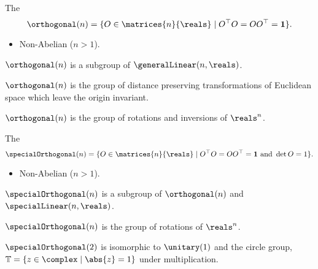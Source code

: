 \begin{dfn}{}{}
    The 
    \begin{equation}
        \orthogonal(n) = \{ O \in \matrices{n}{\reals} \mid O^\trans O = OO^\trans = \ident \}.
    \end{equation}
    
    \begin{multicols}{2}
        \begin{itemize}
            \item Non-Abelian (\(n > 1\)).
        \end{itemize}
    \end{multicols}

    \(\orthogonal(n)\) is a subgroup of \(\generalLinear(n, \reals)\).
    
    \(\orthogonal(n)\) is the group of distance preserving transformations of Euclidean space which leave the origin invariant.
    
    \(\orthogonal(n)\) is the group of rotations and inversions of \(\reals^n\).
\end{dfn}

\begin{dfn}{}{}
    The 
    \begin{equation}
        \specialOrthogonal(n) = \{ O \in \matrices{n}{\reals} \mid O^\trans O = OO^\trans = \ident \text{ and } \det O = 1 \}.
    \end{equation}
    
    \begin{multicols}{2}
        \begin{itemize}
            \item Non-Abelian (\(n > 1\)).
        \end{itemize}
    \end{multicols}
    
    \(\specialOrthogonal(n)\) is a subgroup of \(\orthogonal(n)\) and \(\specialLinear(n, \reals)\).
    
    \(\specialOrthogonal(n)\) is the group of rotations of \(\reals^n\).
    
    \(\specialOrthogonal(2)\) is isomorphic to \(\unitary(1)\) and the circle group, \(\mathbb{T} = \{z \in \complex \mid \abs{z} = 1\}\) under multiplication.
\end{dfn}

